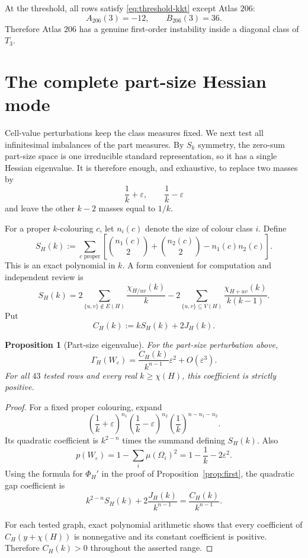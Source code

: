 \documentclass[11pt]{article}
\newtheorem{proposition}[theorem]{Proposition}
\begin{document}
At the threshold, all rows satisfy \eqref{eq:threshold-kkt} except Atlas
$206$:
\[
 A_{206}(3)=-12,
 \qquad
 B_{206}(3)=36.
\]
Therefore Atlas $206$ has a genuine first-order instability inside a
diagonal class of $T_3$.


\section{The complete part-size Hessian mode}

Cell-value perturbations keep the class measures fixed.  We next test all
infinitesimal imbalances of the part measures.  By $S_k$ symmetry, the
zero-sum part-size space is one irreducible standard representation, so it
has a single Hessian eigenvalue.  It is therefore enough, and exhaustive, to
replace two masses by
\[
 \frac1k+\varepsilon,\qquad \frac1k-\varepsilon
\]
and leave the other $k-2$ masses equal to $1/k$.

For a proper $k$-colouring $c$, let $n_i(c)$ denote the size of colour class
$i$.  Define
\[
 S_H(k):=
 \sum_{c\text{ proper}}
 \left[
  \binom{n_1(c)}2+\binom{n_2(c)}2-n_1(c)n_2(c)
 \right].
\]
This is an exact polynomial in $k$.  A form convenient for computation and
independent review is
\[
 S_H(k)
 =2\sum_{\{u,v\}\notin E(H)}\frac{\chi_{H/uv}(k)}k
 -2\sum_{\{u,v\}\subseteq V(H)}
      \frac{\chi_{H+uv}(k)}{k(k-1)}.
\]
Put
\[
 C_H(k):=kS_H(k)+2J_H(k).
\]

\begin{proposition}[Part-size eigenvalue]\label{prop:part-size}
For the part-size perturbation above,
\[
 \Gamma_H(W_\varepsilon)
 =\frac{C_H(k)}{k^{n-1}}\varepsilon^2+O(\varepsilon^3).
\]
For all $43$ tested rows and every real $k\geq\chi(H)$, this coefficient is
strictly positive.
\end{proposition}

\begin{proof}
For a fixed proper colouring, expand
\[
 \left(\frac1k+\varepsilon\right)^{n_1}
 \left(\frac1k-\varepsilon\right)^{n_2}
 \left(\frac1k\right)^{n-n_1-n_2}.
\]
Its quadratic coefficient is $k^{2-n}$ times the summand defining $S_H(k)$.
Also
\[
 p(W_\varepsilon)=1-\sum_i\mu(\Omega_i)^2
 =1-\frac1k-2\varepsilon^2.
\]
Using the formula for $\Phi_H'$ in the proof of
Proposition~\ref{prop:first}, the quadratic gap coefficient is
\[
 k^{2-n}S_H(k)+2\frac{J_H(k)}{k^{n-1}}
 =\frac{C_H(k)}{k^{n-1}}.
\]

For each tested graph, exact polynomial arithmetic shows that every
coefficient of $C_H(y+\chi(H))$ is nonnegative and its constant coefficient
is positive.  Therefore $C_H(k)>0$ throughout the asserted range.
\end{proof}
\end{document}
